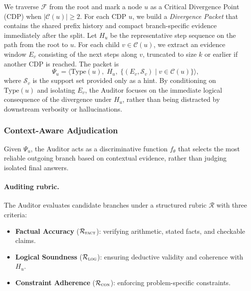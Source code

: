 \documentclass{article}
\theoremstyle{plain}
\theoremstyle{definition}
\theoremstyle{remark}
\begin{document}
We traverse $\mathcal{F}$ from the root and mark a node $u$ as a Critical Divergence Point (CDP) when $|\mathcal{C}(u)| \ge 2$. 
For each CDP $u$, we build a \emph{Divergence Packet} that contains the shared prefix history and compact branch-specific evidence immediately after the split. Let $H_u$ be the representative step sequence on the path from the root to $u$. For each child $v\in\mathcal{C}(u)$, we extract an evidence window $E_v$ consisting of the next steps along $v$, truncated to size $k$ or earlier if another CDP is reached. The packet is
\begin{equation}
    \Psi_u=\Big\langle \text{Type}(u),\; H_u,\; \{(E_v,\mathcal{S}_v)\mid v\in\mathcal{C}(u)\}\Big\rangle,
\end{equation}
where $\mathcal{S}_v$ is the support set provided only as a hint. By conditioning on $\text{Type}(u)$ and isolating $E_v$, the Auditor focuses on the immediate logical consequence of the divergence under $H_u$, rather than being distracted by downstream verbosity or hallucinations.


\subsubsection{Context-Aware Adjudication}
\label{sec:adjudication}

Given $\Psi_u$, the Auditor acts as a discriminative function $f_\theta$ that selects the most reliable outgoing branch based on contextual evidence, rather than judging isolated final answers.

\paragraph{Auditing rubric.}
The Auditor evaluates candidate branches under a structured rubric $\mathcal{R}$ with three criteria:
\begin{itemize}[nosep,noitemsep]
    \item \textbf{Factual Accuracy} ($\mathcal{R}_{\textsc{fact}}$): verifying arithmetic, stated facts, and checkable claims.
    \item \textbf{Logical Soundness} ($\mathcal{R}_{\textsc{log}}$): ensuring deductive validity and coherence with $H_u$.
    \item \textbf{Constraint Adherence} ($\mathcal{R}_{\textsc{con}}$): enforcing problem-specific constraints.
\end{itemize}
\end{document}
